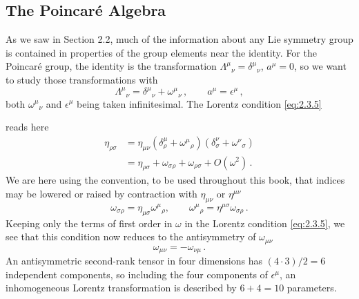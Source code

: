 
\subsection{The Poincar\'e Algebra}

As we saw in Section 2.2, much of the information about any Lie symmetry group
is contained in properties of the group elements near the identity. For the
Poincar\'e group, the identity is the transformation
$\Lambda^\mu{}_{\nu}=\delta^\mu{}_{\nu}$, $a^\mu=0$, so we want to study those
transformations with
\begin{equation}
\Lambda^\mu{}_{\nu}=\delta^\mu{}_{\nu}+\omega^\mu{}_{\nu}\,,
\qquad
a^\mu=\epsilon^\mu\,,
\tag{2.4.1}\label{eq:2.4.1}
\end{equation}
both $\omega^\mu{}_{\nu}$ and $\epsilon^\mu$ being taken infinitesimal. The
Lorentz condition \eqref{eq:2.3.5}

reads here
\[
\begin{aligned}
\eta_{\rho\sigma}
  &= \eta_{\mu\nu}
     (\delta^\mu_{\rho}+\omega^\mu{}_{\rho})
     (\delta^\nu_{\sigma}+\omega^\nu{}_{\sigma}) \\
  &= \eta_{\rho\sigma}+\omega_{\sigma\rho}
     +\omega_{\rho\sigma}+O(\omega^2)\,.
\end{aligned}
\]
We are here using the convention, to be used throughout this book, that
indices may be lowered or raised by contraction with $\eta_{\mu\nu}$ or
$\eta^{\mu\nu}$
\[
\omega_{\sigma\rho}=\eta_{\mu\sigma}\omega^\mu{}_{\rho},
\qquad
\omega^\mu{}_{\rho}=\eta^{\mu\sigma}\omega_{\sigma\rho}\,.
\]
Keeping only the terms of first order in $\omega$ in the Lorentz condition
\eqref{eq:2.3.5}, we see that this condition now reduces to the antisymmetry of
$\omega_{\mu\nu}$
\begin{equation}
\omega_{\mu\nu}=-\omega_{\nu\mu}\,.
\tag{2.4.2}\label{eq:2.4.2}
\end{equation}
An antisymmetric second-rank tensor in four dimensions has $(4\cdot3)/2=6$
independent components, so including the four components of $\epsilon^\mu$,
an inhomogeneous Lorentz transformation is described by $6+4=10$
parameters.

